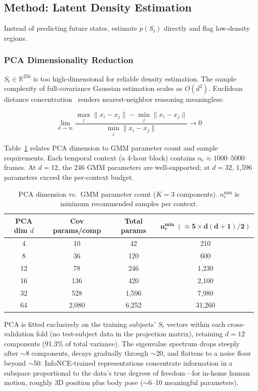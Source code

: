 \documentclass[11pt,a4paper]{article}
\begin{document}
\subsection{Method: Latent Density Estimation}

Instead of predicting future states, estimate $p(S_t)$ directly and flag low-density regions.

\subsubsection{PCA Dimensionality Reduction}

$S_t \in \mathbb{R}^{256}$ is too high-dimensional for reliable density estimation.
The sample complexity of full-covariance Gaussian estimation scales as $O(d^2)$.
Euclidean distance concentration~\cite{beyer1999nearest} renders nearest-neighbor reasoning meaningless:

\begin{equation}
\lim_{d \to \infty} \frac{\max_j \|x_i - x_j\| - \min_j \|x_i - x_j\|}{\min_j \|x_i - x_j\|} \to 0
\end{equation}

Table~\ref{tab:pca_params} relates PCA dimension to GMM parameter count and sample requirements.
Each temporal context (a 4-hour block) contains $n_c \approx 1000$--$5000$ frames.
At $d{=}12$, the 246 GMM parameters are well-supported; at $d{=}32$, 1,596 parameters exceed the per-context budget.

\begin{table}[H]
\centering
\caption{PCA dimension vs.\ GMM parameter count ($K{=}3$ components). $n_c^{\min}$ is minimum recommended samples per context.}
\label{tab:pca_params}
\begin{tabular}{cccc}
\toprule
\textbf{PCA dim $d$} & \textbf{Cov params/comp} & \textbf{Total params} & $\bm{n_c^{\min} \;(\approx 5\times d(d{+}1)/2)}$ \\
\midrule
4   & 10   & 42   & 210 \\
8   & 36   & 120  & 600 \\
12  & 78   & 246  & 1,230 \\
16  & 136  & 420  & 2,100 \\
32  & 528  & 1,596 & 7,980 \\
64  & 2,080 & 6,252 & 31,260 \\
\bottomrule
\end{tabular}
\end{table}

PCA is fitted exclusively on the training subjects' $S_t$ vectors within each cross-validation fold (no test-subject data in the projection matrix), retaining $d{=}12$ components (91.3\% of total variance).
The eigenvalue spectrum drops steeply after $\sim$8 components, decays gradually through $\sim$20, and flattens to a noise floor beyond $\sim$50.
InfoNCE-trained representations concentrate information in a subspace proportional to the data's true degrees of freedom---for in-home human motion, roughly 3D position plus body pose ($\sim$6--10 meaningful parameters).
\end{document}
